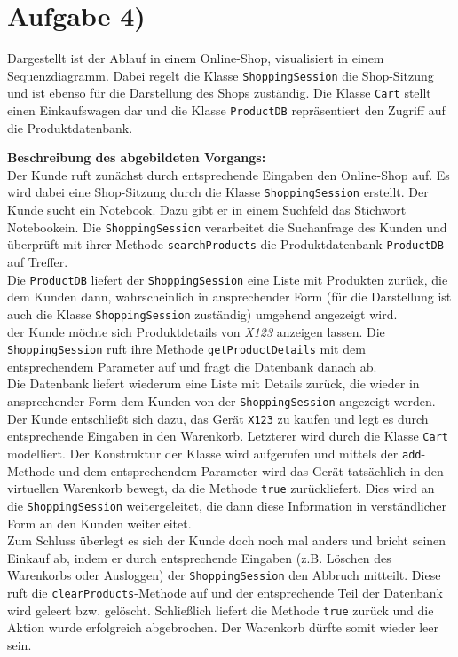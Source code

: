 \documentclass{swp1}
\begin{document}
\section*{Aufgabe 4)}

Dargestellt ist der Ablauf in einem Online-Shop, visualisiert in einem Sequenzdiagramm. Dabei regelt die Klasse \texttt{ShoppingSession} die Shop-Sitzung und ist ebenso für die Darstellung des Shops zuständig. Die Klasse \texttt{Cart} stellt einen Einkaufswagen dar und die Klasse \texttt{ProductDB} repräsentiert den Zugriff auf die Produktdatenbank.

\textbf{Beschreibung des abgebildeten Vorgangs:}\\
Der Kunde ruft zunächst durch entsprechende Eingaben den Online-Shop auf. Es wird dabei eine Shop-Sitzung durch die Klasse \texttt{ShoppingSession} erstellt. Der Kunde sucht ein Notebook. Dazu gibt er in einem Suchfeld das Stichwort \glqq Notebook\grqq ein. Die \texttt{ShoppingSession} verarbeitet die Suchanfrage des Kunden und überprüft mit ihrer Methode \texttt{searchProducts} die Produktdatenbank \texttt{ProductDB} auf Treffer.\\
Die \texttt{ProductDB} liefert der \texttt{ShoppingSession} eine Liste mit Produkten zurück, die dem Kunden dann, wahrscheinlich in ansprechender Form (für die Darstellung ist auch die Klasse \texttt{ShoppingSession} zuständig) umgehend angezeigt wird.\\
der Kunde möchte sich Produktdetails von \textit{X123} anzeigen lassen. Die \texttt{ShoppingSession} ruft ihre Methode \texttt{getProductDetails} mit dem entsprechendem Parameter auf und fragt die Datenbank danach ab. \\
Die Datenbank liefert wiederum eine Liste mit Details zurück, die wieder in ansprechender Form dem Kunden von der \texttt{ShoppingSession} angezeigt werden.\\
Der Kunde entschließt sich dazu, das Gerät \texttt{X123} zu kaufen und legt es durch entsprechende Eingaben in den Warenkorb. Letzterer wird durch die Klasse \texttt{Cart} modelliert. Der Konstruktur der Klasse wird aufgerufen und mittels der \texttt{add}-Methode und dem entsprechendem Parameter wird das Gerät tatsächlich in den virtuellen Warenkorb bewegt, da die Methode \texttt{true} zurückliefert. Dies wird an die \texttt{ShoppingSession} weitergeleitet, die dann diese Information in verständlicher Form an den Kunden weiterleitet. \\
Zum Schluss überlegt es sich der Kunde doch noch mal anders und bricht seinen Einkauf ab, indem er durch entsprechende Eingaben (z.B. Löschen des Warenkorbs oder Ausloggen) der \texttt{ShoppingSession} den Abbruch mitteilt. Diese ruft die \texttt{clearProducts}-Methode auf und der entsprechende Teil der Datenbank wird geleert bzw. gelöscht. Schließlich liefert die Methode \texttt{true} zurück und die Aktion wurde erfolgreich abgebrochen. Der Warenkorb dürfte somit wieder leer sein.
\clearpage
\end{document}
